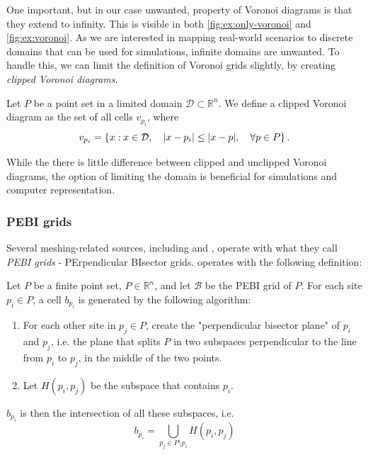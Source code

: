 One important, but in our case unwanted, property of Voronoi diagrams is that they extend to infinity. This is visible in both \autoref{fig:ex:only-voronoi} and \autoref{fig:ex:voronoi}. As we are interested in mapping real-world scenarios to discrete domains that can be used for simulations, infinite domains are unwanted. To handle this, we can limit the definition of Voronoi grids slightly, by creating \emph{clipped Voronoi diagrams}.

\begin{definition}
Let $P$ be a point set in a limited domain $\mathcal{D} \subset \mathbb{R}^n$. We define a clipped Voronoi diagram as the set of all cells $v_{p_i}$, where
\begin{equation}
\label{eq:clipped-voronoi}
    v_{p_i} = \left\{ x : x \in \mathcal{D},\quad \lvert x - p_i\rvert \leq \lvert x - p\rvert,\quad \forall p \in P \right\}.
\end{equation}
\end{definition}

While the there is little difference between clipped and unclipped Voronoi diagrams, the option of limiting the domain is beneficial for simulations and computer representation.


\subsubsection{PEBI grids}
Several meshing-related sources, including \cite{UPR_chapter} and \cite{UPR_thesis}, operate with what they call \emph{PEBI grids} - PErpendicular BIsector grids. \textcite{UPR_thesis} operates with the following definition:

\begin{definition}
\label{def:PEBI-grid}
Let $P$ be a finite point set, $P \in \mathbb{R}^n$, and let $\mathcal{B}$ be the PEBI grid of $P$. For each site $p_i \in P$, a cell $b_{p_i}$ is generated by the following algorithm:
\begin{enumerate}
    \item For each other site in $p_j \in P$, create the "perpendicular bisector plane" of $p_i$ and $p_j$, i.e. the plane that splits $P$ in two subspaces perpendicular to the line from $p_i$ to $p_j$, in the middle of the two points.
    \item Let $H(p_i, p_j)$ be the subspace that contains $p_i$.
\end{enumerate}
$b_{p_i}$ is then the intersection of all these subspaces, i.e.
\begin{equation}
    b_{p_i} = \bigcup_{p_j \in P \setminus p_i} H(p_i, p_j)
\end{equation}
\end{definition}

